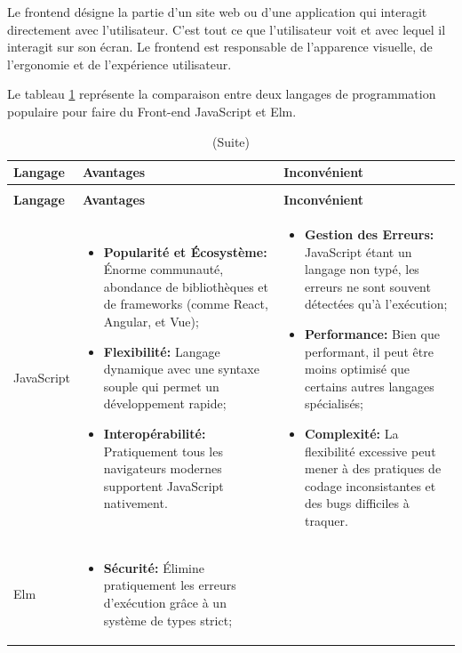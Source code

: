 \documentclass[12pt]{report}
\begin{document}
				Le frontend désigne la partie d'un site web ou d'une application qui interagit directement avec l'utilisateur. C'est tout ce que l'utilisateur voit et avec lequel il interagit sur son écran. Le frontend est responsable de l'apparence visuelle, de l'ergonomie et de l'expérience utilisateur.				

				Le tableau \ref{tab:front} représente la comparaison entre  deux langages de programmation populaire pour faire du Front-end JavaScript et Elm.


				\begin{longtable}{|p{3cm}|p{5.5cm}|p{5.5cm}|} 
						\caption{Comparaison entre JavaScript et Elm.} 
						\label{tab:front}\\ 
						\hline 
						\textbf{Langage} & \textbf{Avantages} & \textbf{Inconvénient}\\ 
						\hline 
						\endfirsthead 	
						\caption[]{(Suite)}\\ 
						\hline 
						\textbf{Langage} & \textbf{Avantages} & \textbf{Inconvénient}\\ 
						\hline 
						\endhead
						JavaScript&
						\begin{itemize}
							\item \textbf{Popularité et Écosystème:} Énorme communauté, abondance de bibliothèques et de frameworks (comme React, Angular, et Vue);
							\item \textbf{Flexibilité:} Langage dynamique avec une syntaxe souple qui permet un développement rapide;
							\item \textbf{Interopérabilité:} Pratiquement tous les navigateurs modernes supportent JavaScript nativement.
						\end{itemize}
						&
						\begin{itemize}
							\item \textbf{Gestion des Erreurs:} JavaScript étant un langage non typé, les erreurs ne sont souvent détectées qu'à l'exécution;
							\item \textbf{Performance:} Bien que performant, il peut être moins optimisé que certains autres langages spécialisés;
							\item \textbf{Complexité:} La flexibilité excessive peut mener à des pratiques de codage inconsistantes et des bugs difficiles à traquer.
						\end{itemize}\\						
						\hline
						Elm&
						\begin{itemize}
							\item \textbf{Sécurité:} Élimine pratiquement les erreurs d'exécution grâce à un système de types strict;

\end{itemize}
\end{longtable}
\end{document}
